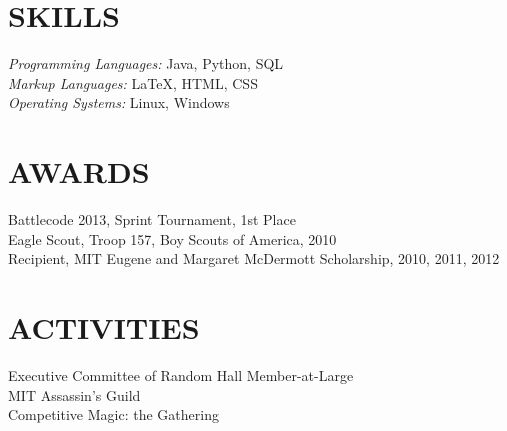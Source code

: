 \documentclass[margin]{res}
\begin{document}
\begin{resume}
\section{SKILLS} {\sl Programming Languages:} Java, Python, SQL \\
                 {\sl Markup Languages:} \LaTeX, HTML, CSS \\
                 {\sl Operating Systems:} Linux, Windows
 
 
\section{AWARDS} Battlecode 2013, Sprint Tournament, 1st Place\\
        Eagle Scout, Troop 157, Boy Scouts of America, 2010\\
        Recipient, MIT Eugene and Margaret McDermott Scholarship, 2010, 2011,
        2012

\section{ACTIVITIES}             
        Executive Committee of Random Hall Member-at-Large \\
        MIT Assassin's Guild \\
        Competitive Magic: the Gathering
 

\end{resume}
\end{document}
